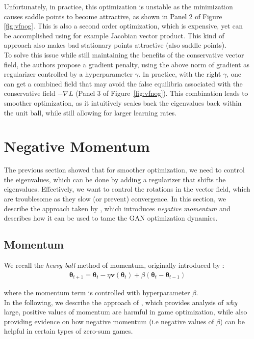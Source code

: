 \documentclass{article}
\renewcommand{\vec}[1]{\ensuremath{\boldsymbol{#1}}}
\begin{document}
Unfortunately, in practice, this optimization is unstable as the minimization causes saddle points to become attractive, as shown in Panel 2 of Figure \ref{fig:vfnog}. This is also a second order optimization, which is expensive, yet can be accomplished using for example Jacobian vector product. This kind of approach also makes bad stationary points attractive (also saddle points).
\\

To solve this issue while still maintaining the benefits of the conservative vector field, the authors propose a gradient penalty, using the above norm of gradient as regularizer controlled by a hyperparameter $\gamma$. In practice, with the right $\gamma$, one can get a combined field that may avoid the false equilibria associated with the conservative field $-\nabla L$ (Panel 3 of Figure~\ref{fig:vfnog}). This combination leads to smoother optimization, as it intuitively scales back the eigenvalues back within the unit ball, while still allowing for larger learning rates.

\section{Negative Momentum}

The previous section showed that for smoother optimization, we need to control the eigenvalues, which can be done by adding a regularizer that shifts the eigenvalues. Effectively, we want to control the rotations in the vector field, which are troublesome as they slow (or prevent) convergence. In this section, we describe the approach taken by \cite{Gidel18NegMom}, which introduces \textit{negative momentum} and describes how it can be used to tame the GAN optimization dynamics.

\subsection{Momentum}
We recall the \textit{heavy ball} method of momentum, originally introduced by \cite{POLYAK19641}:
\begin{align}
\vec{\theta}_{t+1} = \vec{\theta}_t - \eta\vec{v}(\vec{\theta}_t) + \beta(\vec{\theta}_t - \vec{\theta}_{t-1})
\end{align}

where the momentum term is controlled with hyperparameter $\beta$.
\\

In the following, we describe the approach of \cite{Gidel18NegMom}, which provides analysis of \textit{why} large, positive values of momentum are harmful in game optimization, while also providing evidence on how negative momentum (i.e negative values of $\beta$) can be helpful in certain types of zero-sum games.
\\
\end{document}
